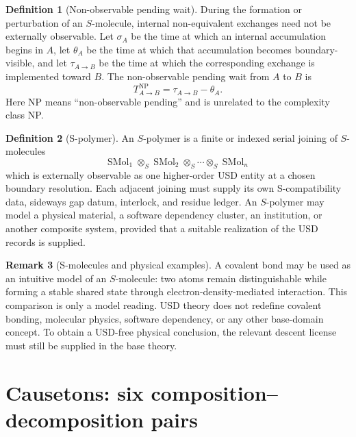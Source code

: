 \documentclass[11pt]{article}
\theoremstyle{definition}
\newtheorem{definition}{Definition}[section]
\newtheorem{remark}[definition]{Remark}
\theoremstyle{plain}
\begin{document}
\begin{definition}[Non-observable pending wait]
During the formation or perturbation of an \(S\)-molecule, internal
non-equivalent exchanges need not be externally observable.  Let
\(\sigma_A\) be the time at which an internal accumulation begins in
\(A\), let \(\theta_A\) be the time at which that accumulation becomes
boundary-visible, and let \(\tau_{A\to B}\) be the time at which the
corresponding exchange is implemented toward \(B\).  The non-observable
pending wait from \(A\) to \(B\) is
\[
  T^{\mathrm{NP}}_{A\to B}
  =
  \tau_{A\to B}-\theta_A.
\]
Here NP means ``non-observable pending'' and is unrelated to the
complexity class NP.
\end{definition}

\begin{definition}[S-polymer]
An \(S\)-polymer is a finite or indexed serial joining of \(S\)-molecules
\[
  \operatorname{SMol}_1
  \mathbin{\otimes_S}
  \operatorname{SMol}_2
  \mathbin{\otimes_S}
  \cdots
  \mathbin{\otimes_S}
  \operatorname{SMol}_n
\]
which is externally observable as one higher-order USD entity at a chosen
boundary resolution.  Each adjacent joining must supply its own
S-compatibility data, sideways gap datum, interlock, and residue ledger.
An \(S\)-polymer may model a physical material, a software dependency
cluster, an institution, or another composite system, provided that a
suitable realization of the USD records is supplied.
\end{definition}

\begin{remark}[S-molecules and physical examples]
A covalent bond may be used as an intuitive model of an \(S\)-molecule:
two atoms remain distinguishable while forming a stable shared state
through electron-density-mediated interaction.  This comparison is only a
model reading.  USD theory does not redefine covalent bonding, molecular
physics, software dependency, or any other base-domain concept.  To obtain
a USD-free physical conclusion, the relevant descent license must still be
supplied in the base theory.
\end{remark}

\section{Causetons: six composition--decomposition pairs}
\end{document}
